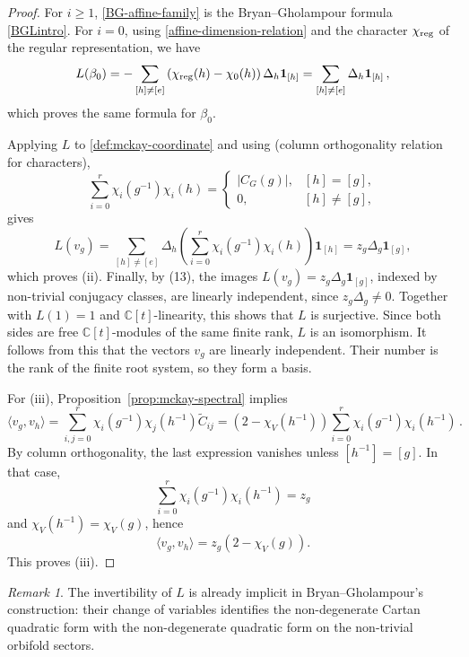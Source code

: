 \documentclass[a4paper,reqno]{amsart}
\theoremstyle{plain} %
\theoremstyle{definition} %
\theoremstyle{remark} %
\newtheorem{rmk}[thm]{Remark}
\newcommand{\fo}{\mathbf{1}}
\newcommand{\1}{\mathds{1}}   %
\begin{document}
\begin{proof}
For $i\geq1$, \eqref{BG-affine-family} is the Bryan--Gholampour formula
\eqref{BGLintro}. For $i=0$, using \eqref{affine-dimension-relation} and the
 character $\chi_{\rm reg}$ of the regular representation, we have
\[
L(\beta_0) = - \sum_{[h] \not= [e]} \left( \chi_{\rm reg} (h) - \chi_0 (h) \right) \Delta_h \fo_{[h]} = \sum_{[h] \not= [e]}\Delta_h \fo_{[h]} \, ,
\]
which proves the same formula for $\beta_0$.

Applying $L$ to \eqref{def:mckay-coordinate} and using  
\cite[Ch. 2, Prop. 7]{Serre77} (column orthogonality relation for characters),
\[
\sum_{i=0}^r \chi_i(g^{-1})\chi_i(h)
=
\begin{cases}
|C_G(g)|,& [h]=[g],\\
0,& [h]\neq[g],
\end{cases}
\]
gives
\[
L(v_g)
=
\sum_{[h]\neq[e]}\Delta_h
\left(\sum_{i=0}^r\chi_i(g^{-1})\chi_i(h)\right)\fo_{[h]}
=z_g\Delta_g\fo_{[g]},
\]
which proves (ii).
Finally, by (13), the images $L(v_g)=z_g\Delta_g \fo_{[g]}$, indexed by non-trivial conjugacy classes,
are linearly independent,
since $z_g\Delta_g\neq0$. Together with
\(L(1)=1\) and \(\mathbb C[t]\)-linearity, this shows that $L$ is surjective.
Since both sides are free \(\mathbb C[t]\)-modules of the same finite rank, \(L\) is an isomorphism.
 It follows from this that the vectors $v_g$ are linearly
independent. Their number is the rank of the finite root system, so
they form a basis.



For (iii), Proposition~\ref{prop:mckay-spectral}  implies
\[
\langle v_g,v_h\rangle
=
\sum_{i,j=0}^r
\chi_i(g^{-1})\chi_j(h^{-1})\widetilde C_{ij}
=
(2-\chi_V(h^{-1}))
\sum_{i=0}^r
\chi_i(g^{-1})\chi_i(h^{-1}) \, .
\]
By column orthogonality, the last expression vanishes unless
$[h^{-1}]=[g]$. In that case,
\[
\sum_{i=0}^r
\chi_i(g^{-1})\chi_i(h^{-1})=z_g
\]
and $\chi_V(h^{-1})=\chi_V(g)$, hence
\[
\langle v_g,v_h\rangle
=
z_g(2-\chi_V(g)).
\]
This proves (iii).
\end{proof}


\begin{rmk}
The invertibility of \(L\) is already implicit in Bryan–Gholampour's construction: 
their change of variables identifies the non-degenerate Cartan quadratic form with the non-degenerate 
quadratic form on the non-trivial orbifold sectors.
\end{rmk}
\end{document}
